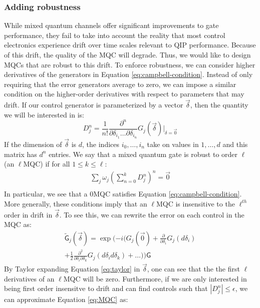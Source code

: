 \documentclass[aps,nofootinbib,pra,notitlepage,twocolumn]{revtex4-1}
\newcommand{\actual}{\ensuremath{\tilde{\mathsf{G}}}}
\newcommand{\target}{\ensuremath{{\mathsf{G}}}}
\begin{document}
\subsubsection{Adding robustness} %
\label{sub:adding_robustness}
While mixed quantum channels offer significant improvements to gate performance, they fail to take into account the reality that most control electronics experience drift over time scales relevant to QIP performance. Because of this drift, the quality of the MQC will degrade. Thus, we would like to design MQCs that are robust to this drift. To enforce robustness, we can consider higher derivatives of the generators in Equation \ref{eq:campbell-condition}. Instead of only requiring that the error generators average to zero, we can impose a similar condition on the higher-order derivatives with respect to parameters that may drift. If our control generator is parameterized by a vector $\vec{\delta}$, then the quantity we will be interested in is:
\begin{equation}
D^n_j = \frac{1}{n!}\frac{\partial^{n}}{\partial\delta_{i_1}\ldots\partial\delta_{i_n}}G_j(\vec{\delta})|_{\delta=\vec{0}}
\end{equation}
If the dimension of $\vec{\delta}$ is $d$, the indices $i_0, \ldots, i_n$ take on values in $1, \ldots, d$ and this matrix has $d^n$ entries. 
We say that a mixed quantum gate is robust to order $\ell$ (an $\ell$MQC) if for all $1 \leq k \leq \ell$:
\begin{equation}\label{eq:MQC}
\begin{gathered}
\sum_j\omega_j(\sum_{n=0}^k D^n_j)^n = \vec{0}\\
\end{gathered}
\end{equation}
In particular, we see that a 0MQC satisfies Equation \ref{eq:campbell-condition}. More generally, these conditions imply that an $\ell$MQC is insensitive to the $\ell^{th}$ order in drift in $\vec{\delta}$. To see this, we can rewrite the error on each control in the MQC as:
\begin{equation}\label{eq:taylor}
\begin{gathered}
\actual_j(\vec{\delta}) = \exp(-i(G_j(\vec{0}) + \frac{\partial}{\partial\delta_i}G_j(d\delta_i)\\ +  \frac{1}{2}\frac{\partial^2}{\partial\delta_i\partial\delta_k} G_j(d\delta_i d\delta_k) + \ldots))\target
\end{gathered}
\end{equation}
By Taylor expanding Equation \ref{eq:taylor} in $\vec{\delta}$, one can see that the the first $\ell$ derivatives of an $\ell$MQC will be zero. Furthermore, if we are only interested in being first order insensitve to drift and can find controls such that $|D_j^n|\leq\epsilon$, we can approximate Equation \ref{eq:MQC} as:
\end{document}
